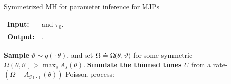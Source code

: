 \begin{algorithm}[H]
   \caption{Symmetrized MH for parameter inference for MJPs }
   \label{alg:MH_improved}
  \begin{tabular}{l l}
   \textbf{Input:  } & \text{The observations $X$,}
                      \text{the MJP path $(s_0, S, T)$, parameters $\theta$} and $\pi_0$.\\ 
   \textbf{Output:  }& \text{A new MJP trajectory $(s'_0, S', T')$, 
                            new MJP parameters $\theta'$}.\\
   \hline
   \end{tabular}
   \begin{algorithmic}[1]
     \State \textbf{Sample $\vartheta \sim q(\cdot| \theta)$}, and 
      set %
	$\Omega \doteq \Omega(\theta,\vartheta)$ %
    for some symmetric $\Omega(\theta,\vartheta) > \max_s A_s(\theta)$.
    \State \textbf{Simulate the thinned times $U$} from a rate-$(\Omega-A_{S(\cdot)}(\theta))$ Poisson process:


\end{algorithmic}
\end{algorithm}
